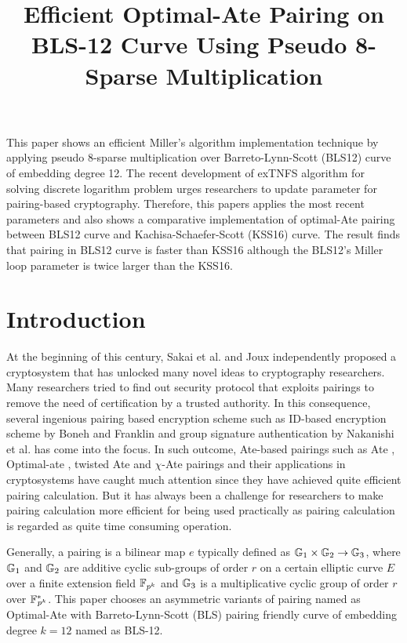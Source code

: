 \title{Efficient Optimal-Ate Pairing on BLS-12 Curve Using Pseudo 8-Sparse Multiplication}

This paper shows an efficient Miller's algorithm implementation technique by applying pseudo 8-sparse multiplication over Barreto-Lynn-Scott (BLS12) curve of embedding degree 12. The recent development of exTNFS algorithm for solving discrete logarithm problem urges researchers to update parameter for pairing-based cryptography. Therefore, this papers applies the most recent parameters and also shows a comparative implementation of optimal-Ate pairing between BLS12 curve and  Kachisa-Schaefer-Scott (KSS16) curve. The result finds that pairing in BLS12 curve is faster than KSS16 although the BLS12's Miller loop parameter is twice larger than the KSS16.


\section{Introduction}
At the beginning of this century, Sakai et al. \cite{sakai2000cryptosystems} and Joux \cite{joux} independently proposed a cryptosystem that has unlocked many novel ideas to cryptography researchers. 
Many researchers tried to find out security protocol that exploits pairings to remove the need of certification by a trusted authority. 
In this consequence, several ingenious pairing based encryption scheme such as ID-based encryption scheme by  Boneh and Franklin \cite{id_based} and group signature authentication by Nakanishi et al. \cite{group_sign_2} has come into the focus. 
In such outcome, Ate-based pairings such as Ate \cite{ate}, Optimal-ate \cite{op_ate_p}, twisted Ate \cite{twisted_ate} and $\chi$-Ate \cite{chibasedBN} pairings and their applications in cryptosystems have caught much attention since they have achieved quite efficient pairing calculation.
But it has always been a challenge for researchers to make pairing calculation more efficient for being used practically as pairing calculation is regarded as quite time consuming operation. 

Generally, a pairing is a bilinear map $e$ typically defined as  ${\mathbb{G}}_{1} \times {\mathbb{G}}_{2} \to {\mathbb{G}}_{3}$, where ${\mathbb{G}}_{1}$ and ${\mathbb{G}}_{2}$ are additive cyclic sub-groups of  order $r$  on a certain elliptic curve $E$ over a finite extension field $\mathbb{F}_{p^k}$ and ${\mathbb{G}}_{3}$ is a multiplicative cyclic group of order $r$ over ${{\mathbb{F}}^{\ast}}_{\!\!\!p^{k}}$.
This paper chooses an asymmetric variants of pairing named as Optimal-Ate \cite{op_ate_p} with Barreto-Lynn-Scott (BLS) \cite{bls} pairing friendly curve of embedding degree $k=12$ named as BLS-12.

